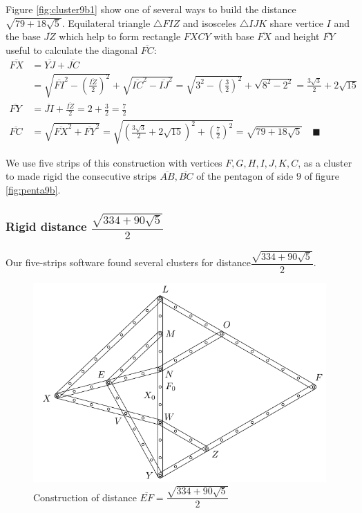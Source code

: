 \documentclass[11pt]{article}
\begin{document}
Figure \ref{fig:cluster9b1} show one of several ways to build the distance $\sqrt{79 + 18\sqrt5}$. 
Equilateral triangle $\triangle{FIZ}$ and isosceles $\triangle{IJK}$ share vertice $I$ and the base $\overline{JZ}$ which help to form rectangle $FXCY$ with base $\overline{FX}$ and height $\overline{FY}$ useful to calculate the diagonal $\overline{FC}$:
\begin{align}
\overline{FX} &= \overline{YJ} + \overline{JC}\nonumber\\
 &= \sqrt{\overline{FI}^2 - \left(\frac{\overline{IZ}}2\right)^2}
  + \sqrt{\overline{IC}^2 - \overline{IJ}^2}
  = \sqrt{3^2 - \left(\frac{3}2\right)^2} + \sqrt{8^2 - 2^2} 
  = \frac{3\sqrt3}2 + 2\sqrt{15} \nonumber\\
\overline{FY} &= \overline{JI} + \frac{\overline{IZ}}2
  = 2 + \frac{3}2 = \frac{7}2 \nonumber\\
\overline{FC} &= \sqrt{\overline{FX}^2 + \overline{FY}^2}
 = \sqrt{\left(\frac{3\sqrt3}2 + 2\sqrt{15}\right)^2 + \left(\frac{7}2\right)^2}
 = \sqrt{79 + 18\sqrt5} \quad\blacksquare
\end{align}

We use five strips of this construction with vertices $F,G,H,I,J,K,C$, as a cluster to made rigid the consecutive strips $\overline{AB},\overline{BC}$ of the pentagon of side $9$ of figure \ref{fig:penta9b}.


\subsubsection{Rigid distance $\dfrac{\sqrt{334 + 90\sqrt5}}2$}

Our five-strips software found several clusters for distance$\dfrac{\sqrt{334 + 90\sqrt5}}2$.

\begin{figure}[h]
\centering
\includegraphics[scale=1]{9/cluster9b2}
\caption{Construction of distance $\overline{EF}=\dfrac{\sqrt{334 + 90\sqrt5}}2$}
\label{fig:cluster9b2}
\end{figure}
\end{document}
